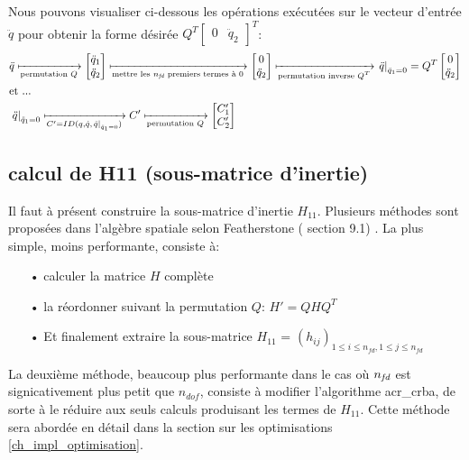 \documentclass{report}
\begin{document}
Nous pouvons visualiser ci-dessous les opérations exécutées sur le vecteur d'entrée $\ddot{q}$ pour obtenir la forme désirée \(Q^T \begin{bmatrix} 0 & \ddot{q}_2 \end{bmatrix}^T\):
\begin{align*}
&\ddot{q} \xmapsto[\textnormal{permutation $Q$}]{} 
\begin{bmatrix}
  \ddot{q}_1 \\
  \ddot{q}_2
\end{bmatrix}
\xmapsto[\textnormal{mettre les $n_{\emph{fd}}$ premiers termes à 0}]{} 
\begin{bmatrix}
  0 \\
  \ddot{q}_2
\end{bmatrix}
\xmapsto[\textnormal{permutation inverse $Q^T$}]{} 
\left. \ddot{q} \right\vert_{\ddot{q}_1=0} = Q^T
\begin{bmatrix}
  0 \\
  \ddot{q}_2
\end{bmatrix} \\
\medskip
&\textnormal{et ...} \\
&\left. \ddot{q} \right\vert_{\ddot{q}_1=0} \xmapsto[C'=ID(q,\dot{q},\left. \ddot{q} \right\vert_{\ddot{q}_1=0})]{} C'
\xmapsto[\textnormal{permutation $Q$}]{} 
\begin{bmatrix}
  C'_1 \\
  C'_2
\end{bmatrix}
\end{align*}


\subsection{calcul de H11 (sous-matrice d'inertie)}

Il faut à présent construire la sous-matrice d'inertie $H_{11}$. Plusieurs méthodes sont proposées dans l'algèbre spatiale selon Featherstone (\cite{bib_featherstone} section 9.1) . La plus simple, moins performante, consiste à:
\begin{itemize}
\item[•] calculer la matrice $H$ complète
\item[•] la réordonner suivant la permutation $Q$: $H'=Q H Q^T$
\item[•] Et finalement extraire la sous-matrice $H_{11}$ = $(h_{ij})_{1 \leqslant i \leqslant n_{fd},1 \leqslant j \leqslant n_{fd}}$
\end{itemize}
\bigskip
La deuxième méthode, beaucoup plus performante dans le cas où $n_{\emph{fd}}$ est signicativement plus petit que $n_{dof}$, consiste à modifier l'algorithme \gls{acr_crba}, de sorte à le réduire aux seuls calculs produisant les termes de $H_{11}$. Cette méthode sera abordée en détail dans la section sur les optimisations \ref{ch_impl_optimisation}.
\end{document}
